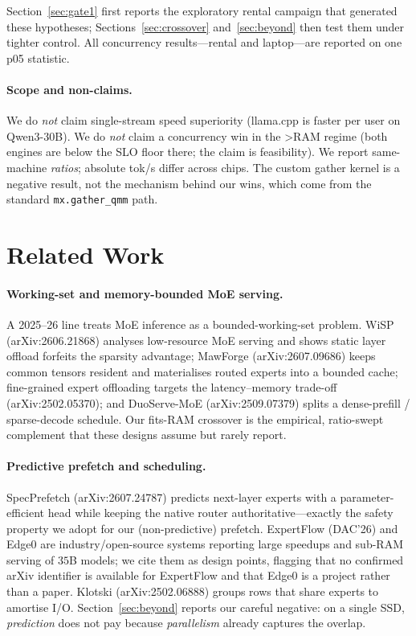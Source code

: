 \documentclass[11pt]{article}
\begin{document}
Section~\ref{sec:gate1} first reports the exploratory rental campaign that generated these
hypotheses; Sections~\ref{sec:crossover} and~\ref{sec:beyond} then test them under tighter
control. All concurrency results---rental and laptop---are reported on one p05 statistic.

\paragraph{Scope and non-claims.} We do \emph{not} claim single-stream speed superiority
(llama.cpp is faster per user on Qwen3-30B). We do \emph{not} claim a concurrency win in
the >RAM regime (both engines are below the SLO floor there; the claim is feasibility).
We report same-machine \emph{ratios}; absolute tok/s differ across chips. The custom
gather kernel is a negative result, not the mechanism behind our wins, which come from
the standard \texttt{mx.gather\_qmm} path.

\section{Related Work}
\label{sec:related}

\paragraph{Working-set and memory-bounded MoE serving.} A 2025--26 line treats MoE
inference as a bounded-working-set problem. WiSP (arXiv:2606.21868) analyses
low-resource MoE serving and shows static layer offload forfeits the sparsity advantage;
MawForge (arXiv:2607.09686) keeps common tensors resident and materialises routed
experts into a bounded cache; fine-grained expert offloading targets the
latency--memory trade-off (arXiv:2502.05370); and DuoServe-MoE (arXiv:2509.07379)
splits a dense-prefill / sparse-decode schedule. Our fits-RAM crossover is the
empirical, ratio-swept complement that these designs assume but rarely report.

\paragraph{Predictive prefetch and scheduling.} SpecPrefetch (arXiv:2607.24787)
predicts next-layer experts with a parameter-efficient head while keeping the native
router authoritative---exactly the safety property we adopt for our (non-predictive)
prefetch. ExpertFlow (DAC'26) and Edge0 are industry/open-source systems reporting large
speedups and sub-RAM serving of $35$B models; we cite them as design points, flagging
that no confirmed arXiv identifier is available for ExpertFlow and that Edge0 is a
project rather than a paper. Klotski (arXiv:2502.06888) groups rows that share experts
to amortise I/O. Section~\ref{sec:beyond} reports our careful negative: on a single SSD,
\emph{prediction} does not pay because \emph{parallelism} already captures the overlap.
\end{document}
